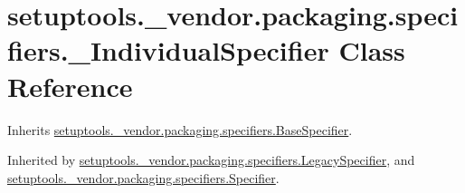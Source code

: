 \hypertarget{classsetuptools_1_1__vendor_1_1packaging_1_1specifiers_1_1___individual_specifier}{}\section{setuptools.\+\_\+vendor.\+packaging.\+specifiers.\+\_\+\+Individual\+Specifier Class Reference}
\label{classsetuptools_1_1__vendor_1_1packaging_1_1specifiers_1_1___individual_specifier}


Inherits \hyperlink{classsetuptools_1_1__vendor_1_1packaging_1_1specifiers_1_1_base_specifier}{setuptools.\+\_\+vendor.\+packaging.\+specifiers.\+Base\+Specifier}.



Inherited by \hyperlink{classsetuptools_1_1__vendor_1_1packaging_1_1specifiers_1_1_legacy_specifier}{setuptools.\+\_\+vendor.\+packaging.\+specifiers.\+Legacy\+Specifier}, and \hyperlink{classsetuptools_1_1__vendor_1_1packaging_1_1specifiers_1_1_specifier}{setuptools.\+\_\+vendor.\+packaging.\+specifiers.\+Specifier}.

